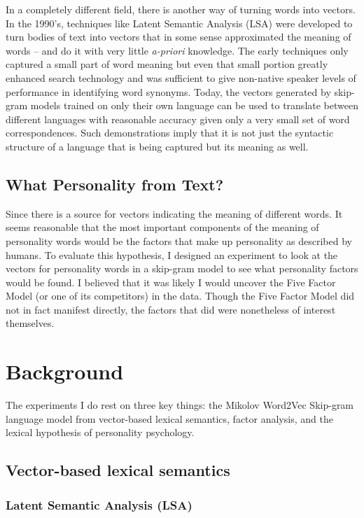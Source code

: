 In a completely different field, there is another way of turning words into 
vectors. In the 1990's, techniques like Latent Semantic Analysis (LSA) were 
developed to turn bodies of text into vectors that in some sense approximated 
the meaning of words -- and do it with very little \textit{a-priori} knowledge. 
The early techniques only captured a small part of word meaning but even that
small portion greatly enhanced search technology and was sufficient to give
non-native speaker levels of performance in identifying word synonyms. Today, 
the vectors generated by skip-gram models trained on only their own language 
can be used to translate between different languages with reasonable accuracy 
given only a very small set of word correspondences. Such demonstrations imply 
that it is not just the syntactic structure of a language that is being 
captured but its meaning as well.

\section{What Personality from Text?}

Since there is a source for vectors indicating the meaning of
different words.  It seems reasonable that the most important
components of the meaning of personality words would be the factors
that make up personality as described by humans. To evaluate this
hypothesis, I designed an experiment to look at the vectors for
personality words in a skip-gram model to see what personality factors
would be found. I believed that it was likely I would uncover the Five
Factor Model (or one of its competitors) in the data. Though the Five
Factor Model did not in fact manifest directly, the factors that did
were nonetheless of interest themselves.

\chapter{Background}

The experiments I do rest on three key things: the Mikolov Word2Vec 
Skip-gram language model from vector-based lexical semantics, factor 
analysis, and the lexical hypothesis of personality psychology.

\section{Vector-based lexical semantics}

\subsection{Latent Semantic Analysis (LSA)}

